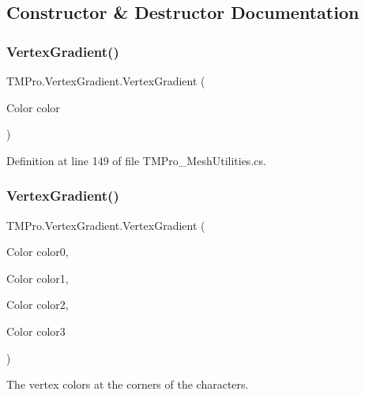 \subsection{Constructor \& Destructor Documentation}
\mbox{\label{struct_t_m_pro_1_1_vertex_gradient_a6302c024c5e234ba15ed043723c1780d}} 
\subsubsection{\texorpdfstring{VertexGradient()}{VertexGradient()}\hspace{0.1cm}{\footnotesize\ttfamily [1/2]}}
{\footnotesize\ttfamily T\+M\+Pro.\+Vertex\+Gradient.\+Vertex\+Gradient (\begin{DoxyParamCaption}\item[{Color}]{color }\end{DoxyParamCaption})}



Definition at line 149 of file T\+M\+Pro\+\_\+\+Mesh\+Utilities.\+cs.

\mbox{\label{struct_t_m_pro_1_1_vertex_gradient_aebe3e48a4520fa379a6a8a175cb24bac}} 
\subsubsection{\texorpdfstring{VertexGradient()}{VertexGradient()}\hspace{0.1cm}{\footnotesize\ttfamily [2/2]}}
{\footnotesize\ttfamily T\+M\+Pro.\+Vertex\+Gradient.\+Vertex\+Gradient (\begin{DoxyParamCaption}\item[{Color}]{color0,  }\item[{Color}]{color1,  }\item[{Color}]{color2,  }\item[{Color}]{color3 }\end{DoxyParamCaption})}



The vertex colors at the corners of the characters. 



